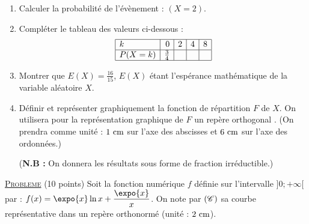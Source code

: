 \begin{enumerate}
\begin{enumerate}
                        \item Calculer la probabilit\'e de l'\'ev\`enement : $(X = 2)$.
                        \item Compl\'eter le tableau des valeurs ci-dessous :
                              \[
                                    \begin{array}{|l|r|r|r|r|}
                                          \hline
                                                k         & 0           & 2       & 4      & 8      \\
                                          \hline
                                                P(X = k)  & \frac{3}{4} &         &        &        \\
                                          \hline
                                    \end{array}
                              \]
                        \item Montrer que $E(X) = \frac{16}{15}$, $E(X)$ \'etant l'esp\'erance math\'ematique de 
                              la variable al\'eatoire $X$.
                        \item D\'efinir et repr\'esenter graphiquement la fonction de r\'epartition $F$ de $X$.
                              On utilisera pour la repr\'esentation graphique de $F$ un rep\`ere orthogonal \Oij .
                              (On prendra comme unit\'e : $1 ~\mathrm{cm}$ sur l'axe des abscisses et $6 ~\mathrm{cm}$ sur l'axe des ordonn\'ees.)
                              
                              (\textbf{N.B :} On donnera les r\'esultats sous forme de fraction irr\'eductible.)
                  \end{enumerate}
      \end{enumerate}
\noindent \underline{\textsc{Probleme}} (10 points) \newline
      Soit la fonction num\'erique $f$ d\'efinie sur l'intervalle $]0;+\infty[$ par : 
      $\displaystyle{f(x) = \expo{x} \ln x + \frac{\expo{x}}{x}}$.
      On note par $(\mathscr{C})$ sa courbe repr\'esentative dans un rep\`ere orthonorm\'e \Oij{} (unit\'e : $2 ~\mathrm{cm}$).
